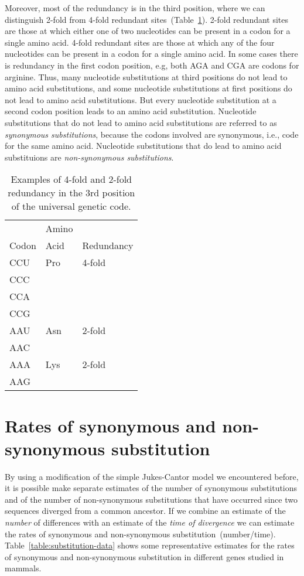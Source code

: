 \documentclass[12pt]{article}
\begin{document}
Moreover, most of the redundancy is in the third position, where we
can distinguish 2-fold from 4-fold redundant
sites~(Table~\ref{table:fold}). 2-fold redundant sites are those at
which either one of two nucleotides can be present in a codon for a
single amino acid. 4-fold redundant sites are those at which any of
the four nucleotides can be present in a codon for a single amino
acid. In some cases there is redundancy in the first codon position,
e.g, both AGA and CGA are codons for arginine. Thus, many nucleotide
substitutions at third positions do not lead to amino acid
substitutions, and some nucleotide substitutions at first positions do
not lead to amino acid substitutions. But every nucleotide
substitution at a second codon position leads to an amino acid
substitution. Nucleotide substitutions that do not lead to amino acid
substitutions are referred to as {\it synonymous substitutions},
because the codons involved are synonymous, i.e., code for the same
amino acid. Nucleotide substitutions that do lead to amino acid
substituions are {\it non-synonymous substitutions}. 

\begin{table}
\begin{center}
\begin{tabular}{lll}
\hline\hline
      & Amino & \\
Codon & Acid  & Redundancy \\
\hline
CCU   & Pro   & 4-fold \\
CCC \\
CCA \\
CCG \\
\hline
AAU   & Asn   & 2-fold \\
AAC \\
AAA   & Lys   & 2-fold \\
AAG \\
\hline
\end{tabular}
\end{center}
\caption{Examples of 4-fold and 2-fold redundancy in the 3rd position
  of the universal genetic code.}\label{table:fold}
\end{table}

\section*{Rates of synonymous and non-synonymous substitution}

By using a modification of the simple Jukes-Cantor model we
encountered before, it is possible make separate estimates of the
number of synonymous substitutions and of the number of non-synonymous
substitutions that have occurred since two sequences diverged from a
common ancestor. If we combine an estimate of the {\it number\/} of
differences with an estimate of the {\it time of divergence\/} we can
estimate the rates of synonymous and non-synonymous
substitution~(number/time). Table~\ref{table:substitution-data} shows some
representative estimates for the rates of synonymous and
non-synonymous substitution in different genes studied in
mammals.
\end{document}

